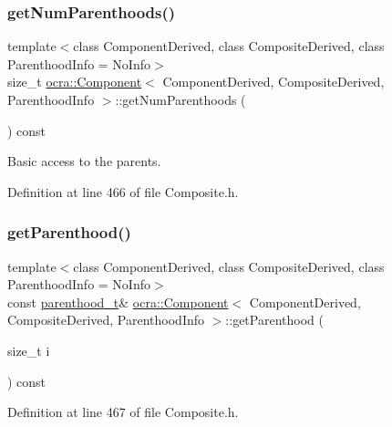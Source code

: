 \subsubsection{\texorpdfstring{get\+Num\+Parenthoods()}{getNumParenthoods()}}
{\footnotesize\ttfamily template$<$class Component\+Derived, class Composite\+Derived, class Parenthood\+Info = No\+Info$>$ \\
size\+\_\+t \hyperlink{classocra_1_1Component}{ocra\+::\+Component}$<$ Component\+Derived, Composite\+Derived, Parenthood\+Info $>$\+::get\+Num\+Parenthoods (\begin{DoxyParamCaption}{ }\end{DoxyParamCaption}) const\hspace{0.3cm}{\ttfamily [inline]}}



Basic access to the parents. 



Definition at line 466 of file Composite.\+h.

\hypertarget{classocra_1_1Component_a368948e115852fa524f9a8da257aed1f}{}\label{classocra_1_1Component_a368948e115852fa524f9a8da257aed1f} 
\subsubsection{\texorpdfstring{get\+Parenthood()}{getParenthood()}}
{\footnotesize\ttfamily template$<$class Component\+Derived, class Composite\+Derived, class Parenthood\+Info = No\+Info$>$ \\
const \hyperlink{classocra_1_1Component_a70fb7cda78934a9f017c7e46c1407953}{parenthood\+\_\+t}\& \hyperlink{classocra_1_1Component}{ocra\+::\+Component}$<$ Component\+Derived, Composite\+Derived, Parenthood\+Info $>$\+::get\+Parenthood (\begin{DoxyParamCaption}\item[{size\+\_\+t}]{i }\end{DoxyParamCaption}) const\hspace{0.3cm}{\ttfamily [inline]}}



Definition at line 467 of file Composite.\+h.

\hypertarget{classocra_1_1Component_a8a0e052f36c60889562e921751b02a37}{}\label{classocra_1_1Component_a8a0e052f36c60889562e921751b02a37} 
